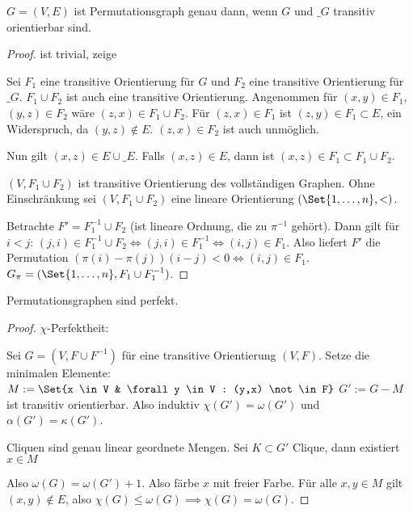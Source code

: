 \begin{st}
    $G = (V, E)$ ist Permutationsgraph genau dann, wenn $G$ und $\_G$ transitiv orientierbar sind.
    \begin{proof}
        \ProofImplication ist trivial, zeige \ProofImplication*

        Sei $F_1$ eine transitive Orientierung für $G$ und $F_2$ eine transitive Orientierung für $\_G$.
        $F_1 \cup F_2$ ist auch eine transitive Orientierung.
        Angenommen für $(x,y) \in F_1$, $(y, z) \in F_2$ wäre $(z,x) \in F_1 \cup F_2$.
        Für $(z,x) \in F_1$ ist $(z, y) \in F_1 \subset E$, ein Widerspruch, da $(y,z) \not\in E$.
        $(z,x) \in F_2$ ist auch unmöglich.

        Nun gilt $(x,z) \in E \cup \_E$.
        Falls $(x, z) \in E$, dann ist $(x, z) \in F_1 \subset F_1 \cup F_2$.

        $(V, F_1 \cup F_2)$ ist transitive Orientierung des vollständigen Graphen.
        Ohne Einschränkung sei $(V, F_1 \cup F_2)$ eine lineare Orientierung $(\Set{1, \dotsc, n}, <)$.

        Betrachte $F' = F_1^{-1} \cup F_2$ (ist lineare Ordnung, die zu $\pi^{-1}$ gehört).
        Dann gilt für $i < j$:
        \begin{math}
            (j,i) \in F_1^{-1} \cup F_2 \iff (j,i) \in F_1^{-1} \iff (i,j) \in F_1.
        \end{math}
        Also liefert $F'$ die Permutation $(\pi(i) - \pi(j))(i - j) < 0 \iff (i,j) \in F_1$.
        $G_\pi = (\Set{1, \dotsc, n}, F_1 \cup F_1^{-1})$.
    \end{proof}
\end{st}

\begin{st}
    Permutationsgraphen sind perfekt.
    \begin{proof}
        $\chi$-Perfektheit:

        Sei $G = (V, F \cup F^{-1})$ für eine transitive Orientierung $(V, F)$.
        Setze die minimalen Elemente:
        \begin{math}
            M := \Set{x \in V & \forall y \in V : (y,x) \not\in F}
        \end{math}
        $G' := G - M$ ist transitiv orientierbar.
        Also induktiv $\chi(G') = \omega(G')$ und $\alpha(G') = \kappa(G')$.

        Cliquen sind genau linear geordnete Mengen.
        Sei $K \subset G'$ Clique, dann existiert $x \in M$

        Also $\omega(G) = \omega(G') + 1$.
        Also färbe $x$ mit freier Farbe.
        Für alle $x,y \in M$ gilt $(x,y) \not\in E$, also $\chi(G) \le \omega(G) \implies \chi(G) = \omega(G)$.
    \end{proof}
\end{st}

